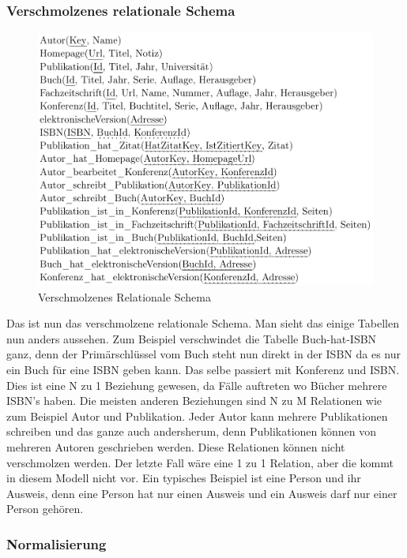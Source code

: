 \newpage
\subsubsection{Verschmolzenes relationale Schema}

\begin{figure}[!htb]
	\centering
	\includegraphics[width=13cm,keepaspectratio]{bilder/verschmolzenesRelationaleSchema}
	\caption{Verschmolzenes Relationale Schema}
	\label{fig:verschmolzenesrelationalesSchema}
\end{figure}

Das ist nun das verschmolzene relationale Schema. Man sieht das einige Tabellen nun anders aussehen. Zum Beispiel verschwindet die Tabelle Buch-hat-ISBN ganz, denn der Primärschlüssel vom Buch steht nun direkt in der ISBN da es nur ein Buch für eine ISBN geben kann. Das selbe passiert mit Konferenz und ISBN. Dies ist eine N zu 1 Beziehung gewesen, da Fälle auftreten wo Bücher mehrere ISBN's haben. Die meisten anderen Beziehungen sind N zu M Relationen wie zum Beispiel Autor und Publikation. Jeder Autor kann mehrere Publikationen schreiben und das ganze auch andersherum, denn Publikationen können von mehreren Autoren geschrieben werden. Diese Relationen können nicht verschmolzen werden. Der letzte Fall wäre eine 1 zu 1 Relation, aber die kommt in diesem Modell nicht vor. Ein typisches Beispiel ist eine Person und ihr Ausweis, denn eine Person hat nur einen Ausweis und ein Ausweis darf nur einer Person gehören.

\subsubsection{Normalisierung}

